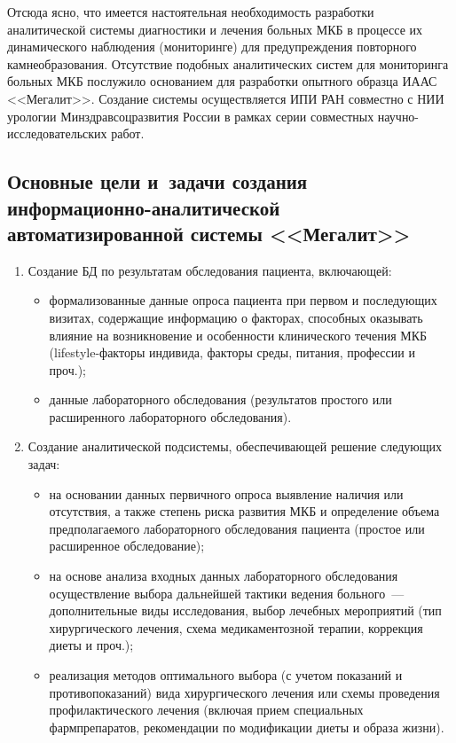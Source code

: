\begin{multicols}{2}
{}
      
      Отсюда ясно, что имеется настоятельная необходимость разработки аналитической 
системы диагностики и лечения больных МКБ в процессе их динами\-ческого наблюдения 
(мониторинге) для пред\-упреж\-де\-ния повторного камнеобразования. Отсутствие подобных 
аналитических систем для мониторинга больных МКБ послужило основанием для разработки 
опытного образца ИААС 
<<Мегалит>>. Создание системы осуществляется ИПИ РАН совместно с НИИ урологии 
Минздравсоцразвития России в рамках серии совместных на\-уч\-но-ис\-сле\-до\-ва\-тель\-ских работ.
      
\subsection*{Основные цели и~задачи создания информационно-аналитической автоматизированной системы
 <<Мегалит>>}

      \noindent
      \begin{enumerate}[1.]
      \item  Создание БД по результатам обследования пациента, включающей:\\[-15pt]
      \begin{itemize}
\item формализованные данные опроса пациента при первом и последующих визитах, 
содержащие информацию о факторах, способных оказывать влияние на возникновение и 
особенности клинического течения МКБ (lifestyle-фак\-то\-ры индивида, факторы среды, 
питания, профессии и проч.);\\[-15pt]
\item данные лабораторного обследования (результатов простого или расширенного 
лабораторного обследования).\\[-15pt] 
\end{itemize}
      \item  Создание аналитической подсистемы, обеспечивающей решение следующих 
задач:\\[-15pt]
      \begin{itemize}
\item на основании данных первичного опроса выявление наличия или отсутствия, а также 
степень риска развития МКБ и определение объема предполагаемого лабораторного 
обследования пациента (простое или расширенное обследование);\\[-15pt]
\item на основе анализа входных данных лабораторного обследования осуществление выбора 
дальнейшей тактики ведения больного~--- дополнительные виды исследования, выбор 
лечебных мероприятий (тип хирургического лечения, схема медикаментозной терапии, 
коррекция диеты и проч.);\\[-15pt]
\item реализация методов оптимального выбора (с учетом показаний и противопоказаний) вида 
хирургического лечения или схемы проведения профилактического лечения (включая прием 
специальных фармпрепаратов, рекомендации по модификации диеты и образа жизни).
\end{itemize}
\end{enumerate}


\end{multicols}
